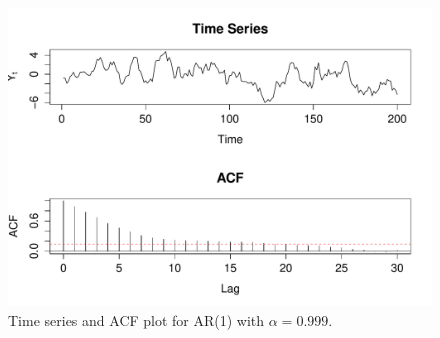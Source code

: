 \documentclass[10pt,a4paper]{article}
\begin{document}
\begin{figure}[h!]
\includegraphics[width=\linewidth]{plots/p5_alpha1.pdf}
\caption{Time series and ACF plot for AR(1) with $\alpha = 0.999$.}
\end{figure}
\end{document}
